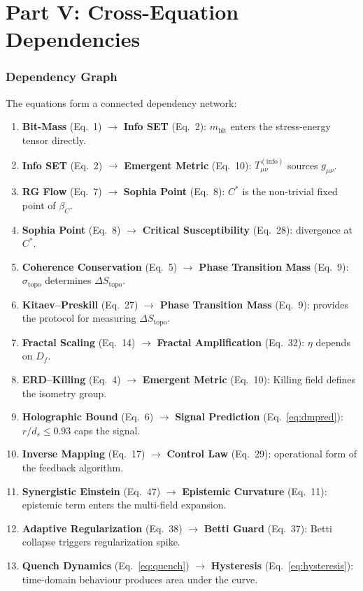\documentclass[11pt,a4paper]{article}
\theoremstyle{remark}
\begin{document}
\part{Part V: Cross-Equation Dependencies}
\label{part:dependencies}

\section{Dependency Graph}
\label{sec:depgraph}

The equations form a connected dependency network:

\begin{enumerate}[nosep]
    \item \textbf{Bit-Mass} (Eq.~1) $\to$ \textbf{Info SET} (Eq.~2): $m_{\text{bit}}$ enters the stress-energy tensor directly.
    \item \textbf{Info SET} (Eq.~2) $\to$ \textbf{Emergent Metric} (Eq.~10): $T_{\mu\nu}^{(\text{info})}$ sources $g_{\mu\nu}$.
    \item \textbf{RG Flow} (Eq.~7) $\to$ \textbf{Sophia Point} (Eq.~8): $C^*$ is the non-trivial fixed point of $\beta_C$.
    \item \textbf{Sophia Point} (Eq.~8) $\to$ \textbf{Critical Susceptibility} (Eq.~28): divergence at $C^*$.
    \item \textbf{Coherence Conservation} (Eq.~5) $\to$ \textbf{Phase Transition Mass} (Eq.~9): $\sigma_{\text{topo}}$ determines $\Delta S_{\text{topo}}$.
    \item \textbf{Kitaev--Preskill} (Eq.~27) $\to$ \textbf{Phase Transition Mass} (Eq.~9): provides the protocol for measuring $\Delta S_{\text{topo}}$.
    \item \textbf{Fractal Scaling} (Eq.~14) $\to$ \textbf{Fractal Amplification} (Eq.~32): $\eta$ depends on $D_f$.
    \item \textbf{ERD--Killing} (Eq.~4) $\to$ \textbf{Emergent Metric} (Eq.~10): Killing field defines the isometry group.
    \item \textbf{Holographic Bound} (Eq.~6) $\to$ \textbf{Signal Prediction} (Eq.~\eqref{eq:dmpred}): $r/d_s \leq 0.93$ caps the signal.
    \item \textbf{Inverse Mapping} (Eq.~17) $\to$ \textbf{Control Law} (Eq.~29): operational form of the feedback algorithm.
    \item \textbf{Synergistic Einstein} (Eq.~47) $\to$ \textbf{Epistemic Curvature} (Eq.~11): epistemic term enters the multi-field expansion.
    \item \textbf{Adaptive Regularization} (Eq.~38) $\to$ \textbf{Betti Guard} (Eq.~37): Betti collapse triggers regularization spike.
    \item \textbf{Quench Dynamics} (Eq.~\eqref{eq:quench}) $\to$ \textbf{Hysteresis} (Eq.~\eqref{eq:hysteresis}): time-domain behaviour produces area under the curve.
\end{enumerate}
\end{document}
